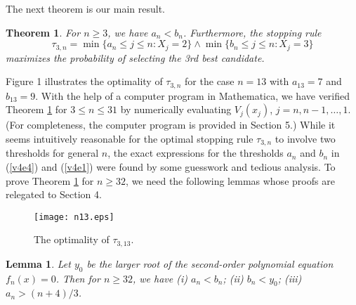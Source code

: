 \documentclass[12pt, A4paper, oneside]{article}
\theoremstyle{plain}
\newtheorem{thm}{Theorem}[section]
\newtheorem{lem}{Lemma}[section]
\numberwithin{equation}{section}
\begin{document}
The next theorem is our main result.

\begin{thm}\label{st4.1}
For $n\ge 3$, we have $a_n<b_n$. Furthermore, the stopping rule
\begin{equation*}
\tau_{3,n}=\min\{a_n\le j \le n: X_j=2\} \wedge \min\{b_n \le j \le n: X_j=3\}
\end{equation*}
maximizes the probability of selecting the 3rd best candidate.
\end{thm}

Figure 1 illustrates the optimality of $\tau_{3,n}$ for the case $n=13$ with $a_{13}=7$ and $b_{13}=9$. With the help of a computer program in Mathematica, we have verified Theorem \ref{st4.1} for $3\le n\le 31$ by numerically evaluating $V_j(x_j)$, $j=n,n-1,\dots,1$. (For completeness, the computer program is provided in Section 5.) While it seems intuitively reasonable for the optimal stopping rule $\tau_{3,n}$ to involve two thresholds for general $n$, the exact expressions for the thresholds $a_n$ and $b_n$ in (\ref{v4e4}) and (\ref{v4e1}) were found by some guesswork and tedious analysis. To prove Theorem \ref{st4.1} for $n \ge 32$, we need the following lemmas whose proofs are relegated to Section 4.
\begin{figure}
\texttt{[image: n13.eps]}
\caption{The optimality of $\tau_{3,13}$.}
\end{figure}
\begin{lem}\label{sl4.2}
Let $y_0$ be the larger root of the second-order polynomial equation $f_n(x)=0$.
 Then for $n\ge32$, we have {\upshape(i)} $a_n<b_n$; {\upshape(ii)} $b_n<y_0$; {\upshape(iii)} $a_n>(n+4)/3$.
\end{lem}
\end{document}
